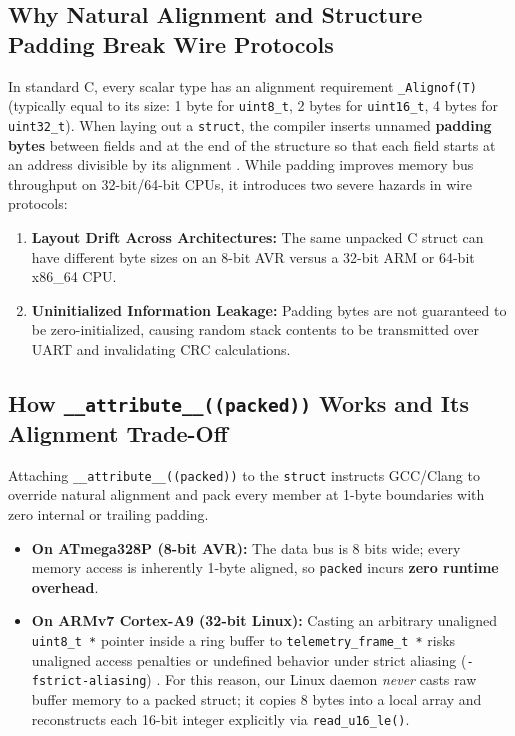 \documentclass[11pt,a4paper,oneside]{report}
\begin{document}
\subsection{Why Natural Alignment and Structure Padding Break Wire Protocols}
In standard C, every scalar type has an alignment requirement \texttt{\_Alignof(T)} (typically equal to its size: 1 byte for \texttt{uint8\_t}, 2 bytes for \texttt{uint16\_t}, 4 bytes for \texttt{uint32\_t}). When laying out a \texttt{struct}, the compiler inserts unnamed \textbf{padding bytes} between fields and at the end of the structure so that each field starts at an address divisible by its alignment \cite{gustedt2025,seacord2020}. While padding improves memory bus throughput on 32-bit/64-bit CPUs, it introduces two severe hazards in wire protocols:
\begin{enumerate}
\item \textbf{Layout Drift Across Architectures:} The same unpacked C struct can have different byte sizes on an 8-bit AVR versus a 32-bit ARM or 64-bit x86\_64 CPU.
\item \textbf{Uninitialized Information Leakage:} Padding bytes are not guaranteed to be zero-initialized, causing random stack contents to be transmitted over UART and invalidating CRC calculations.
\end{enumerate}

\subsection{How \texttt{\_\_attribute\_\_((packed))} Works and Its Alignment Trade-Off}
Attaching \texttt{\_\_attribute\_\_((packed))} to the \texttt{struct} instructs GCC/Clang to override natural alignment and pack every member at 1-byte boundaries with zero internal or trailing padding.
\begin{itemize}
\item \textbf{On ATmega328P (8-bit AVR):} The data bus is 8 bits wide; every memory access is inherently 1-byte aligned, so \texttt{packed} incurs \textbf{zero runtime overhead}.
\item \textbf{On ARMv7 Cortex-A9 (32-bit Linux):} Casting an arbitrary unaligned \texttt{uint8\_t *} pointer inside a ring buffer to \texttt{telemetry\_frame\_t *} risks unaligned access penalties or undefined behavior under strict aliasing (\texttt{-fstrict-aliasing}) \cite{seacord2020}. For this reason, our Linux daemon \emph{never} casts raw buffer memory to a packed struct; it copies 8 bytes into a local array and reconstructs each 16-bit integer explicitly via \texttt{read\_u16\_le()}.
\end{itemize}
\end{document}
